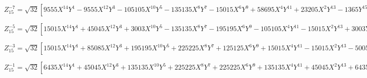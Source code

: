\documentclass[10pt,landscape]{article}
\begin{document}
\vspace{1.2 mm}
\noindent $ Z^{-7}_{15} = \sqrt{32} [9555X^{14}Y^{1} -9555X^{12}Y^{3} -105105X^{10}Y^{5} -135135X^{8}Y^{7} -15015X^{6}Y^{9} +58695X^{4}Y^{11} +23205X^{2}Y^{13} -1365Y^{15} -28028X^{12}Y^{1} +56056X^{10}Y^{3} +252252X^{8}Y^{5} +144144X^{6}Y^{7} -100100X^{4}Y^{9} -72072X^{2}Y^{11} +4004Y^{13} +30030X^{10}Y^{1} -90090X^{8}Y^{3} -180180X^{6}Y^{5} +25740X^{4}Y^{7} +81510X^{2}Y^{9} -4290Y^{11} -13860X^{8}Y^{1} +55440X^{6}Y^{3} +27720X^{4}Y^{5} -39600X^{2}Y^{7} +1980Y^{9} +2310X^{6}Y^{1} -11550X^{4}Y^{3} +6930X^{2}Y^{5} -330Y^{7}] $

\vspace{1.2 mm}
\noindent $ Z^{-5}_{15} = \sqrt{32} [15015X^{14}Y^{1} +45045X^{12}Y^{3} +3003X^{10}Y^{5} -135135X^{8}Y^{7} -195195X^{6}Y^{9} -105105X^{4}Y^{11} -15015X^{2}Y^{13} +3003Y^{15} -50050X^{12}Y^{1} -100100X^{10}Y^{3} +90090X^{8}Y^{5} +360360X^{6}Y^{7} +290290X^{4}Y^{9} +60060X^{2}Y^{11} -10010Y^{13} +64350X^{10}Y^{1} +64350X^{8}Y^{3} -180180X^{6}Y^{5} -283140X^{4}Y^{7} -90090X^{2}Y^{9} +12870Y^{11} -39600X^{8}Y^{1} +110880X^{4}Y^{5} +63360X^{2}Y^{7} -7920Y^{9} +11550X^{6}Y^{1} -11550X^{4}Y^{3} -20790X^{2}Y^{5} +2310Y^{7} -1260X^{4}Y^{1} +2520X^{2}Y^{3} -252Y^{5}] $

\vspace{1.2 mm}
\noindent $ Z^{-3}_{15} = \sqrt{32} [15015X^{14}Y^{1} +85085X^{12}Y^{3} +195195X^{10}Y^{5} +225225X^{8}Y^{7} +125125X^{6}Y^{9} +15015X^{4}Y^{11} -15015X^{2}Y^{13} -5005Y^{15} -54054X^{12}Y^{1} -252252X^{10}Y^{3} -450450X^{8}Y^{5} -360360X^{6}Y^{7} -90090X^{4}Y^{9} +36036X^{2}Y^{11} +18018Y^{13} +77220X^{10}Y^{1} +283140X^{8}Y^{3} +360360X^{6}Y^{5} +154440X^{4}Y^{7} -25740X^{2}Y^{9} -25740Y^{11} -55440X^{8}Y^{1} -147840X^{6}Y^{3} -110880X^{4}Y^{5} +18480Y^{9} +20790X^{6}Y^{1} +34650X^{4}Y^{3} +6930X^{2}Y^{5} -6930Y^{7} -3780X^{4}Y^{1} -2520X^{2}Y^{3} +1260Y^{5} +252X^{2}Y^{1} -84Y^{3}] $

\vspace{1.2 mm}
\noindent $ Z^{-1}_{15} = \sqrt{32} [6435X^{14}Y^{1} +45045X^{12}Y^{3} +135135X^{10}Y^{5} +225225X^{8}Y^{7} +225225X^{6}Y^{9} +135135X^{4}Y^{11} +45045X^{2}Y^{13} +6435Y^{15} -24024X^{12}Y^{1} -144144X^{10}Y^{3} -360360X^{8}Y^{5} -480480X^{6}Y^{7} -360360X^{4}Y^{9} -144144X^{2}Y^{11} -24024Y^{13} +36036X^{10}Y^{1} +180180X^{8}Y^{3} +360360X^{6}Y^{5} +360360X^{4}Y^{7} +180180X^{2}Y^{9} +36036Y^{11} -27720X^{8}Y^{1} -110880X^{6}Y^{3} -166320X^{4}Y^{5} -110880X^{2}Y^{7} -27720Y^{9} +11550X^{6}Y^{1} +34650X^{4}Y^{3} +34650X^{2}Y^{5} +11550Y^{7} -2520X^{4}Y^{1} -5040X^{2}Y^{3} -2520Y^{5} +252X^{2}Y^{1} +252Y^{3} -8Y^{1}] $
\end{document}
